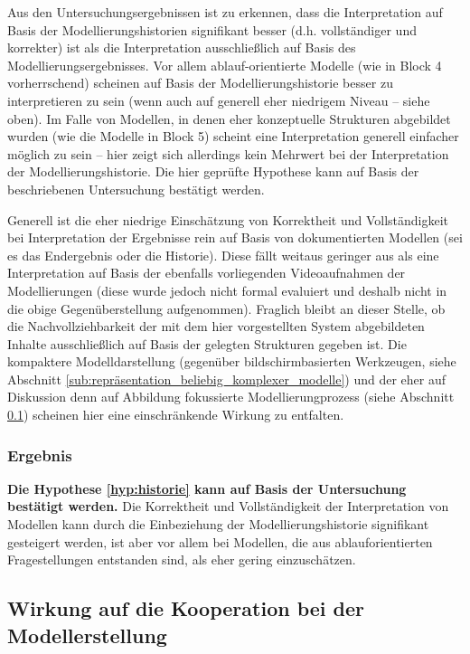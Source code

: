 Aus den Untersuchungsergebnissen ist zu erkennen, dass die Interpretation auf Basis der Modellierungshistorien signifikant besser (d.h. vollständiger und korrekter) ist als die Interpretation ausschließlich auf Basis des Modellierungsergebnisses. Vor allem ablauf-orientierte Modelle (wie in Block 4 vorherrschend) scheinen auf Basis der Modellierungshistorie besser zu interpretieren zu sein (wenn auch auf generell eher niedrigem Niveau -- siehe oben). Im Falle von Modellen, in denen eher konzeptuelle Strukturen abgebildet wurden (wie die Modelle in Block 5) scheint eine Interpretation generell einfacher möglich zu sein -- hier zeigt sich allerdings kein Mehrwert bei der Interpretation der Modellierungshistorie. Die hier geprüfte Hypothese kann auf Basis der beschriebenen Untersuchung bestätigt werden.

Generell ist die eher niedrige Einschätzung von Korrektheit und Vollständigkeit bei Interpretation der Ergebnisse rein auf Basis von dokumentierten Modellen (sei es das Endergebnis oder die Historie). Diese fällt weitaus geringer aus als eine Interpretation auf Basis der ebenfalls vorliegenden Videoaufnahmen der Modellierungen (diese wurde jedoch nicht formal evaluiert und deshalb nicht in die obige Gegenüberstellung aufgenommen). Fraglich bleibt an dieser Stelle, ob die Nachvollziehbarkeit der mit dem hier vorgestellten System abgebildeten Inhalte ausschließlich auf Basis der gelegten Strukturen gegeben ist. Die kompaktere Modelldarstellung (gegenüber bildschirmbasierten Werkzeugen, siehe Abschnitt \ref{sub:repräsentation_beliebig_komplexer_modelle}) und der eher auf Diskussion denn auf Abbildung fokussierte Modellierungprozess (siehe Abschnitt \ref{sub:wirkung_auf_die_kooperation_bei_der_modellerstellung}) scheinen hier eine einschränkende Wirkung zu entfalten.

\subsubsection{Ergebnis} 

\textbf{Die Hypothese \ref{hyp:historie} kann auf Basis der Untersuchung bestätigt werden.} Die Korrektheit und Vollständigkeit der Interpretation von Modellen kann durch die Einbeziehung der Modellierungshistorie signifikant gesteigert werden, ist aber vor allem bei Modellen, die aus ablauforientierten Fragestellungen entstanden sind, als eher gering einzuschätzen. 

\subsection{Wirkung auf die Kooperation bei der Modellerstellung} %
\label{sub:wirkung_auf_die_kooperation_bei_der_modellerstellung}

